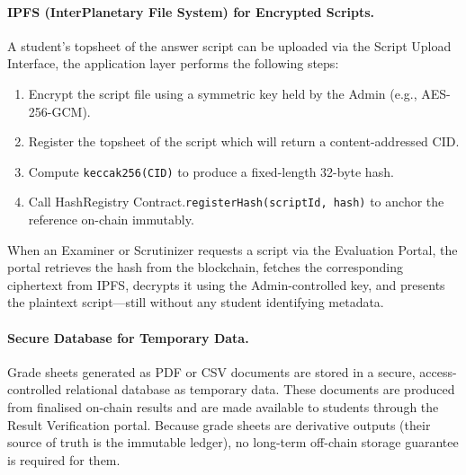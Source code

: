\documentclass[conference]{IEEEtran}
\begin{document}
\paragraph{IPFS (InterPlanetary File System) for Encrypted Scripts.}
A student's topsheet of the answer script can be uploaded via the Script Upload Interface,
the application layer performs the following steps:
\begin{enumerate}
    \item Encrypt the script file using a symmetric key held by the Admin
    (e.g., AES-256-GCM).
    \item Register the topsheet of the script which will return a content-addressed CID.
    \item Compute \texttt{keccak256(CID)} to produce a fixed-length 32-byte
    hash.
    \item Call HashRegistry Contract.\texttt{registerHash(scriptId, hash)}
    to anchor the reference on-chain immutably.
\end{enumerate}

When an Examiner or Scrutinizer requests a script via the Evaluation Portal,
the portal retrieves the hash from the blockchain, fetches the corresponding
ciphertext from IPFS, decrypts it using the Admin-controlled key, and
presents the plaintext script---still without any student identifying
metadata.

\paragraph{Secure Database for Temporary Data.}
Grade sheets generated as PDF or CSV documents are stored in a secure,
access-controlled relational database as temporary data. These documents
are produced from finalised on-chain results and are made available to
students through the Result Verification portal. Because grade sheets are
derivative outputs (their source of truth is the immutable ledger), no
long-term off-chain storage guarantee is required for them.

\end{document}
